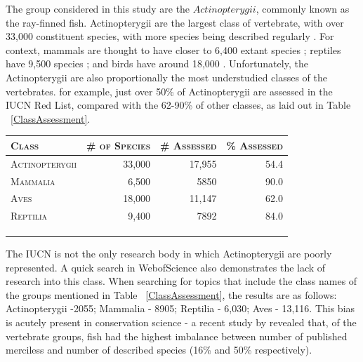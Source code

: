 \documentclass[11pt]{article}
\begin{document}
The group considered in this study are the \(Actinopterygii\), commonly 
known as the ray-finned fish. Actinopterygii are the largest class of 
vertebrate, with over 33,000 constituent species, with more species being 
described regularly \autocite{Fishbase}. For 
context, mammals are thought to have closer to 6,400 extant species 
\autocite{Mammal2020}; reptiles have 9,500 species 
\autocite{Pincheira-Donoso2013}
; and birds have around 18,000 \autocite{Barrowclough2016}. Unfortunately, the 
Actinopterygii are also proportionally 
the most understudied classes of the vertebrates. for example, just over 50\% 
of Actinopterygii are assessed in the IUCN Red List, 
compared with the 62-90\% of other classes, as laid out in 
Table ~\ref{ClassAssessment}. \\

	\begin{tabular}{lrrr}
	\textsc{Class} & \textsc{\# of Species} & \textsc{\# Assessed} & \textsc{\% 
	Assessed} \\	
	\hline
	\textsc{Actinopterygii}	& 33,000 & 17,955 & 54.4 \\
	\textsc{Mammalia} & 6,500 & 5850 & 90.0 \\
	\textsc{Aves} & 18,000 & 11,147 & 62.0 \\
	\textsc{Reptilia} & 9,400 & 7892 & 84.0 \\ 
	\multicolumn{4}{l}{\caption{Table ~\ref{ClassAssessment}: IUCN 
	Red List  assessments for vertebrate classes}} \\
	\multicolumn{4}{l}{ \autocite{Mammal2020, Pincheira-Donoso2013}} \\
	\multicolumn{4}{l}{ \autocite{Barrowclough2016, Fishbase}}
	\label{ClassAssessment}
	
\end{tabular}
\newline
\newline

The IUCN is not the only research body in which Actinopterygii are poorly 
represented. A 
quick search in WebofScience also demonstrates the lack of research into this 
class. When searching for topics that include the class names of the groups 
mentioned in Table ~\ref{ClassAssessment}, the results are as follows: 
Actinopterygii -2055; Mammalia - 8905; Reptilia - 6,030; Aves - 13,116.  This 
bias is acutely present in conservation science - a recent study by 
\cite{Watson2017} revealed that, of the vertebrate groups, fish had the highest 
imbalance between number of published merciless and number of described species 
(16\% and 50\% respectively).
\end{document}

